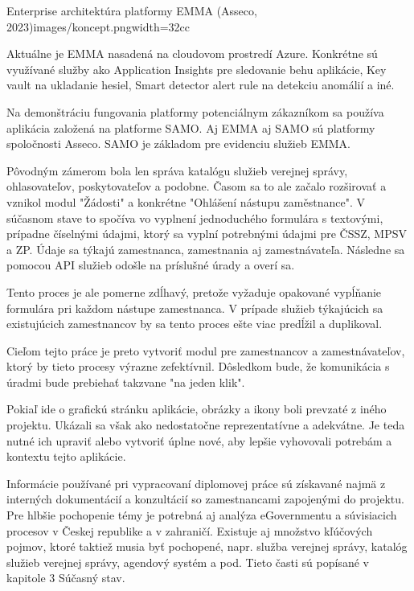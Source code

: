 {Enterprise architektúra platformy EMMA  (Asseco, 2023)}{images/koncept.png}{width=32cc}

Aktuálne je EMMA nasadená na cloudovom prostredí Azure. Konkrétne sú využívané služby ako Application Insights pre sledovanie behu aplikácie, Key vault na ukladanie hesiel, Smart detector alert rule na detekciu anomálií a iné. 

Na demonštráciu fungovania platformy potenciálnym zákazníkom sa používa aplikácia založená na platforme SAMO. Aj EMMA aj SAMO sú platformy spoločnosti Asseco. SAMO je základom pre evidenciu služieb EMMA. 

Pôvodným zámerom bola len správa katalógu služieb verejnej správy, ohlasovateľov, poskytovateľov a podobne. Časom sa to ale začalo rozširovať a vznikol modul "Žádosti" a konkrétne "Ohlášení nástupu zaměstnance". V súčasnom stave to spočíva vo vyplnení jednoduchého formulára s textovými, prípadne číselnými údajmi, ktorý sa vyplní potrebnými údajmi pre ČSSZ, MPSV a ZP. Údaje sa týkajú zamestnanca, zamestnania aj zamestnávateľa. Následne sa pomocou API služieb odošle na príslušné úrady a overí sa.

Tento proces je ale pomerne zdĺhavý, pretože vyžaduje opakované vypĺňanie formulára pri každom nástupe zamestnanca. V prípade služieb týkajúcich sa existujúcich zamestnancov by sa tento proces ešte viac predĺžil a duplikoval.

Cieľom tejto práce je preto vytvoriť modul pre zamestnancov a zamestnávateľov, ktorý by tieto procesy výrazne zefektívnil. Dôsledkom bude, že komunikácia s úradmi bude prebiehať takzvane "na jeden klik".

Pokiaľ ide o grafickú stránku aplikácie, obrázky a ikony boli prevzaté z iného projektu. Ukázali sa však ako nedostatočne reprezentatívne a adekvátne. Je teda nutné ich upraviť alebo vytvoriť úplne nové, aby lepšie vyhovovali potrebám a kontextu tejto aplikácie.


Informácie používané pri vypracovaní diplomovej práce sú získavané najmä z interných dokumentácií a konzultácií so zamestnancami zapojenými do projektu. Pre hlbšie pochopenie témy je potrebná aj analýza eGovernmentu a súvisiacich procesov v Českej republike a v zahraničí. Existuje aj množstvo kľúčových pojmov, ktoré taktiež musia byť pochopené, napr. služba verejnej správy, katalóg služieb verejnej správy, agendový systém a pod. Tieto časti sú popísané v kapitole 3 Súčasný stav.

